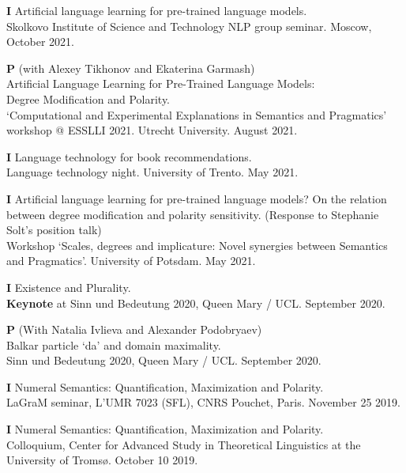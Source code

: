 \documentclass[12pt,letterpaper]{article}
\begin{document}
{\begin{hangparas}{.25in}{1}
\textbf{I} \hspace{2.5mm}  Artificial language learning for pre-trained language models.\\
Skolkovo Institute of Science and Technology NLP group seminar. Moscow, October 2021.

\textbf{P} \hspace{2.5mm} (with Alexey Tikhonov and Ekaterina Garmash) \\Artificial Language Learning for Pre-Trained Language Models: \\ Degree Modification and Polarity.\\
`Computational and Experimental Explanations in Semantics and Pragmatics' workshop @ ESSLLI 2021. Utrecht University. August 2021.

\textbf{I} \hspace{2.5mm} Language technology for book recommendations.\\
Language technology night. University of Trento. May 2021.

\textbf{I} \hspace{2.5mm} Artificial language learning for pre-trained language models? On the relation between degree modification and polarity sensitivity. (Response to Stephanie Solt's position talk)\\
Workshop `Scales, degrees and implicature: Novel synergies between Semantics and Pragmatics'.
University of Potsdam. May 2021.

\textbf{I} \hspace{2.5mm} Existence and Plurality.\\
{\bf Keynote} at Sinn und Bedeutung 2020, Queen Mary / UCL. September 2020.

\textbf{P} \hspace{2.5mm} (With Natalia Ivlieva and Alexander Podobryaev)\\
Balkar particle `da' and domain maximality.\\
Sinn und Bedeutung 2020, Queen Mary / UCL. September 2020.

\textbf{I} \hspace{2mm} Numeral Semantics: Quantification, Maximization and Polarity.\\
LaGraM seminar, L'UMR 7023 (SFL), CNRS Pouchet, Paris. November 25 2019.

\textbf{I} \hspace{2mm} Numeral Semantics: Quantification, Maximization and Polarity.\\
Colloquium, Center for Advanced Study in Theoretical Linguistics at the University of Troms\o. October 10 2019.


\end{hangparas}}
\end{document}
